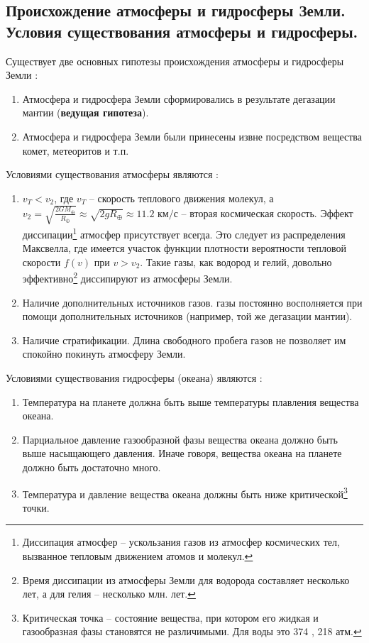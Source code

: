 \subsection{Происхождение атмосферы и гидросферы Земли. Условия существования атмосферы и гидросферы.}
Существует две основных гипотезы происхождения атмосферы и гидросферы Земли \cite{Nosov2019-3}:
\begin{enumerate}
\item Атмосфера и гидросфера Земли сформировались в результате дегазации мантии (\textbf{ведущая гипотеза}).
\item Атмосфера и гидросфера Земли были принесены извне посредством вещества комет, метеоритов и т.п.
\end{enumerate}
Условиями существования атмосферы являются \cite{Nosov2019-3}:
\begin{enumerate}
\item $v_{T}<v_{2}$, где $v_{T}$ -- скорость теплового движения молекул, а $v_{2}=\sqrt{\frac{2GM_{\oplus}}{R_{\oplus}}}\approx\sqrt{2gR_{\oplus}}\approx\text{11.2 км/с}$ -- вторая космическая скорость. Эффект диссипации\footnote{Диссипация атмосфер -- ускользания газов из атмосфер космических тел, вызванное тепловым движением атомов и молекул.} атмосфер присутствует всегда. Это следует из распределения Максвелла, где имеется участок функции плотности вероятности тепловой скорости $f(v)$ при $v>v_{2}$. Такие газы, как водород и гелий, довольно эффективно\footnote{Время  диссипации из атмосферы Земли для водорода составляет несколько лет, а для гелия -- несколько млн. лет.} диссипируют из атмосферы Земли.
\item Наличие дополнительных источников газов.  газы постоянно восполняется  при помощи дополнительных источников (например, той же дегазации мантии).
\item Наличие стратификации. Длина свободного пробега  газов не позволяет им спокойно покинуть атмосферу Земли.
\end{enumerate}
Условиями существования гидросферы (океана) являются \cite{Nosov2019-3}:
\begin{enumerate}
\item Температура на планете должна быть выше температуры плавления вещества океана.
\item Парциальное давление газообразной фазы вещества океана должно быть выше насыщающего давления. Иначе говоря, вещества океана на планете должно быть достаточно много.
\item Температура и давление вещества океана должны быть ниже критической\footnote{Критическая точка -- состояние вещества, при котором его жидкая и газообразная фазы становятся не различимыми. Для воды это 374 \textcelsius, 218 атм.} точки.
\end{enumerate}
